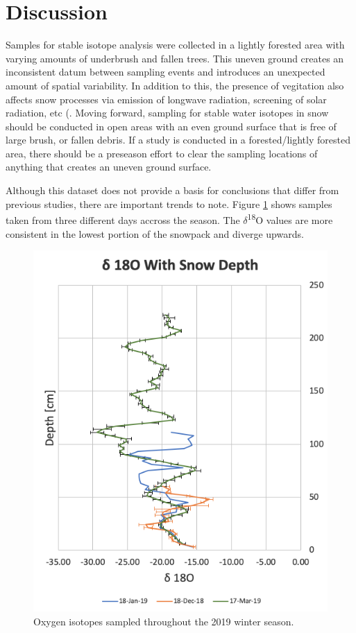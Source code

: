 \section{Discussion}
 Samples for stable isotope analysis were collected in a lightly forested area with varying amounts of underbrush and fallen trees. This uneven ground creates an inconsistent datum between sampling events and introduces an unexpected amount of spatial variability. In addition to this, the presence of vegitation also affects snow processes via emission of longwave radiation, screening of solar radiation, etc (\cite{beria_larsen_ceperley_michelon_vennemann_schaefli_2017}. Moving forward, sampling for stable water isotopes in snow should be conducted in open areas with an even ground surface that is free of large brush, or fallen debris. If a study is conducted in a forested/lightly forested area, there should be a preseason effort to clear the sampling locations of anything that creates an uneven ground surface. 

Although this dataset does not provide a basis for conclusions that differ from previous studies, there are important trends to note. Figure \ref{fig:WY2019_Isotopes} shows samples taken from three different days accross the season. The $\delta$\textsuperscript{18}O values are more consistent in the lowest portion of the snowpack and diverge upwards. 

\begin{figure}
    \centering
    \includegraphics[width=0.8\linewidth]{figures/Isotopes/Season_Isotopes.png}
    \caption{Oxygen isotopes sampled throughout the 2019 winter season.}
    \label{fig:WY2019_Isotopes}
 \end{figure}

